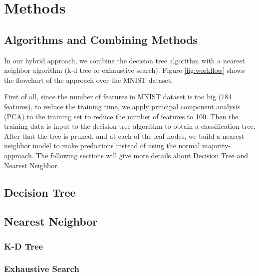 \section{Methods}
	\subsection{Algorithms and Combining Methods}
		In our hybrid approach, we combine the decision tree algorithm with a nearest neighbor algorithm (k-d tree or exhaustive search). Figure \ref{fig:workflow} shows the flowchart of the approach over the MNIST dataset. 
		
		First of all, since the number of features in MNIST dataset is too big (784 features), to reduce the training time, we apply principal component analysis (PCA) to the training set to reduce the number of features to 100. Then the training data is input to the decision tree algorithm to obtain a classification tree. After that the tree is pruned, and at each of the leaf nodes, we build a nearest neighbor model to make predictions instead of using the normal majority-approach. The following sections will give more details about Decision Tree and Nearest Neighbor.
		
	\subsection{Decision Tree}
    
	\subsection{Nearest Neighbor}
		\subsubsection{K-D Tree}
		\subsubsection{Exhaustive Search}

